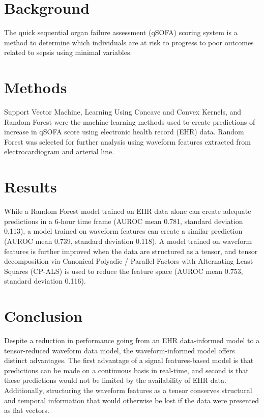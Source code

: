 
\section*{Background}
The quick sequential organ failure assessment (qSOFA) scoring system is a method to determine which individuals are at risk to progress to poor outcomes related to sepsis using minimal variables. 

\section*{Methods}
Support Vector Machine, Learning Using Concave and Convex Kernels, and Random Forest were the machine learning methods used to create predictions of increase in qSOFA score using electronic health record (EHR) data. Random Forest was selected for further analysis using waveform features extracted from electrocardiogram and arterial line. 

\section*{Results}
While a Random Forest model trained on EHR data alone can create adequate predictions in a 6-hour time frame (AUROC mean 0.781, standard deviation 0.113), a model trained on waveform features can create a similar prediction (AUROC mean 0.739, standard deviation 0.118). A model trained on waveform features is further improved when the data are structured as a tensor, and tensor decomposition via Canonical Polyadic / Parallel Factors with Alternating Least Squares (CP-ALS) is used to reduce the feature space (AUROC mean 0.753, standard deviation 0.116).

\section*{Conclusion}
Despite a reduction in performance going from an EHR data-informed model to a tensor-reduced waveform data model, the waveform-informed model offers distinct advantages. The first advantage of a signal features-based model is that predictions can be made on a continuous basis in real-time, and second is that these predictions would not be limited by the availability of EHR data. Additionally, structuring the waveform features as a tensor conserves structural and temporal information that would otherwise be lost if the data were presented as flat vectors.